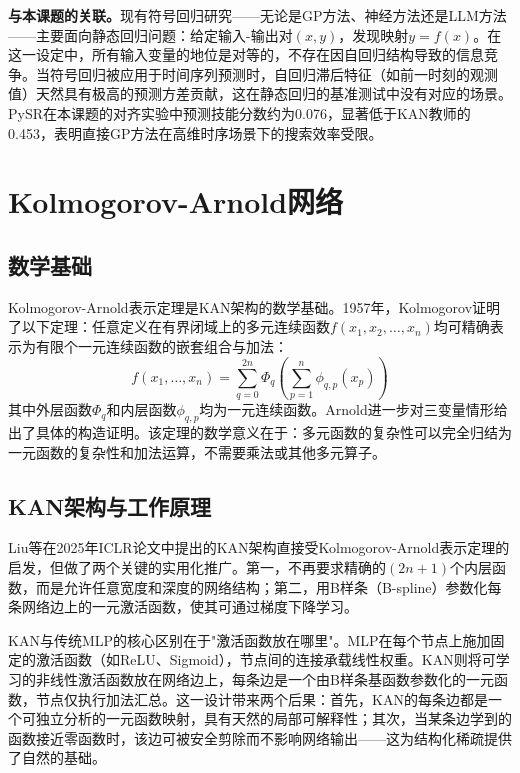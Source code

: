 \textbf{与本课题的关联。}现有符号回归研究——无论是GP方法、神经方法还是LLM方法——主要面向静态回归问题：给定输入-输出对$(x, y)$，发现映射$y = f(x)$。在这一设定中，所有输入变量的地位是对等的，不存在因自回归结构导致的信息竞争。当符号回归被应用于时间序列预测时，自回归滞后特征（如前一时刻的观测值）天然具有极高的预测方差贡献，这在静态回归的基准测试中没有对应的场景。PySR\cite{cranmer2023pysr}在本课题的对齐实验中预测技能分数约为0.076，显著低于KAN教师的0.453，表明直接GP方法在高维时序场景下的搜索效率受限。

\section{Kolmogorov-Arnold网络}

\subsection{数学基础}

Kolmogorov-Arnold表示定理\cite{kolmogorov1957representation,arnold1957functions}是KAN架构的数学基础。1957年，Kolmogorov\cite{kolmogorov1957representation}证明了以下定理：任意定义在有界闭域上的多元连续函数$f(x_1, x_2, \ldots, x_n)$均可精确表示为有限个一元连续函数的嵌套组合与加法：
\begin{equation}
f(x_1, \ldots, x_n) = \sum_{q=0}^{2n} \Phi_q \left( \sum_{p=1}^{n} \phi_{q,p}(x_p) \right)
\end{equation}
其中外层函数$\Phi_q$和内层函数$\phi_{q,p}$均为一元连续函数。Arnold\cite{arnold1957functions}进一步对三变量情形给出了具体的构造证明。该定理的数学意义在于：多元函数的复杂性可以完全归结为一元函数的复杂性和加法运算，不需要乘法或其他多元算子。

\subsection{KAN架构与工作原理}

Liu等\cite{liu2025kan}在2025年ICLR论文中提出的KAN架构直接受Kolmogorov-Arnold表示定理的启发，但做了两个关键的实用化推广。第一，不再要求精确的$(2n+1)$个内层函数，而是允许任意宽度和深度的网络结构；第二，用B样条（B-spline）参数化每条网络边上的一元激活函数，使其可通过梯度下降学习。

KAN与传统MLP的核心区别在于"激活函数放在哪里"。MLP在每个节点上施加固定的激活函数（如ReLU、Sigmoid），节点间的连接承载线性权重。KAN则将可学习的非线性激活函数放在网络边上，每条边是一个由B样条基函数参数化的一元函数，节点仅执行加法汇总。这一设计带来两个后果：首先，KAN的每条边都是一个可独立分析的一元函数映射，具有天然的局部可解释性；其次，当某条边学到的函数接近零函数时，该边可被安全剪除而不影响网络输出——这为结构化稀疏提供了自然的基础。

